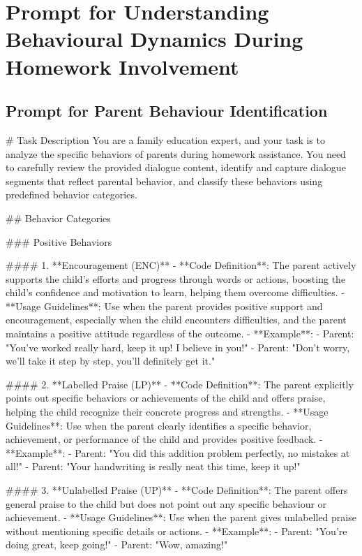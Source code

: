 \section{Prompt for Understanding Behavioural Dynamics During Homework Involvement}

\normalsize
\subsection{Prompt for Parent Behaviour Identification}

\begingroup
\footnotesize
\begin{spverbatim}
# Task Description
You are a family education expert, and your task is to analyze the specific behaviors of parents during homework assistance. You need to carefully review the provided dialogue content, identify and capture dialogue segments that reflect parental behavior, and classify these behaviors using predefined behavior categories.

## Behavior Categories

### Positive Behaviors

#### 1. **Encouragement (ENC)**
- **Code Definition**: The parent actively supports the child's efforts and progress through words or actions, boosting the child's confidence and motivation to learn, helping them overcome difficulties.
- **Usage Guidelines**: Use when the parent provides positive support and encouragement, especially when the child encounters difficulties, and the parent maintains a positive attitude regardless of the outcome.
- **Example**:  
  - Parent: "You've worked really hard, keep it up! I believe in you!"
  - Parent: "Don’t worry, we’ll take it step by step, you’ll definitely get it."

#### 2. **Labelled Praise (LP)**
- **Code Definition**: The parent explicitly points out specific behaviors or achievements of the child and offers praise, helping the child recognize their concrete progress and strengths.
- **Usage Guidelines**: Use when the parent clearly identifies a specific behavior, achievement, or performance of the child and provides positive feedback.
- **Example**:  
  - Parent: "You did this addition problem perfectly, no mistakes at all!"
  - Parent: "Your handwriting is really neat this time, keep it up!"

#### 3. **Unlabelled Praise (UP)**
- **Code Definition**: The parent offers general praise to the child but does not point out any specific behaviour or achievement.
- **Usage Guidelines**: Use when the parent gives unlabelled praise without mentioning specific details or actions.
- **Example**:  
  - Parent: "You're doing great, keep going!"
  - Parent: "Wow, amazing!"


\end{spverbatim}
